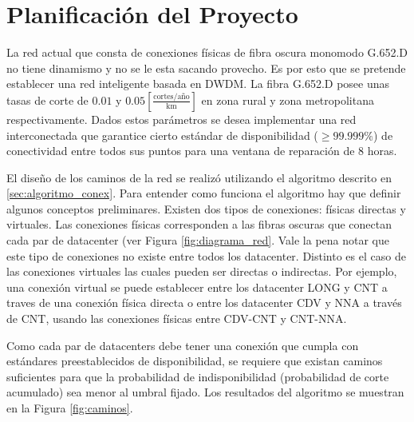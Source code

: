 \section{Planificaci\'on del Proyecto}\label{sec:planificacion}

La red actual que consta de conexiones físicas de fibra oscura monomodo G.652.D no tiene dinamismo y no se le esta sacando provecho. Es por esto que se pretende establecer una red inteligente basada en DWDM. La fibra G.652.D posee unas tasas de corte de $0.01$ y $0.05 [\frac{\text{cortes}/\text{año}}{\text{km}}]$ en zona rural y zona metropolitana respectivamente. Dados estos parámetros se desea implementar una red interconectada que garantice cierto estándar de disponibilidad ($\geq 99.999\%$) de conectividad entre todos sus puntos para una ventana de reparación de $8$ horas.

El diseño de los caminos de la red se realizó utilizando el algoritmo descrito en \ref{sec:algoritmo_conex}. Para entender como funciona el algoritmo hay que definir algunos conceptos preliminares. Existen dos tipos de conexiones: físicas directas y virtuales. Las conexiones físicas corresponden a las fibras oscuras que conectan cada par de datacenter (ver Figura \ref{fig:diagrama_red}. Vale la pena notar que este tipo de conexiones no existe entre todos los datacenter. Distinto es el caso de las conexiones virtuales las cuales pueden ser directas o indirectas. Por ejemplo, una conexión virtual se puede establecer entre los datacenter LONG y CNT a traves de una conexión física directa o entre los datacenter CDV y NNA a través de CNT, usando las conexiones físicas entre CDV-CNT y CNT-NNA.

Como cada par de datacenters debe tener una conexión que cumpla con estándares preestablecidos de disponibilidad, se requiere que existan caminos suficientes para que la probabilidad de indisponibilidad (probabilidad de corte acumulado) sea menor al umbral fijado. Los resultados del algoritmo se muestran en la Figura \ref{fig:caminos}.\\


